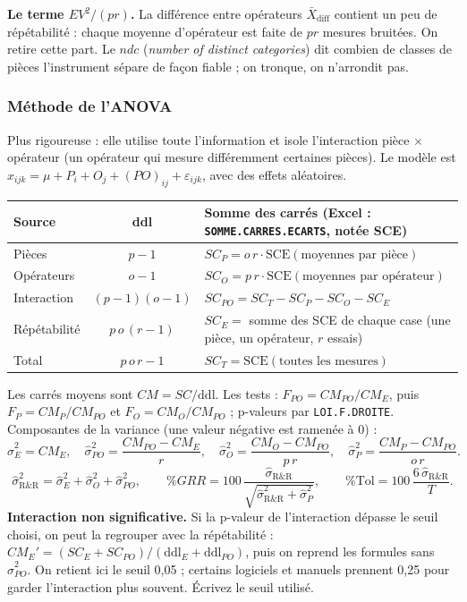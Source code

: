 \documentclass[11pt,a4paper]{article}
\newcommand{\xl}[1]{\texttt{\small #1}}
\begin{document}
\textbf{Le terme $EV^2/(pr)$.} La différence entre opérateurs $\bar X_{\text{diff}}$ contient un peu de répétabilité : chaque moyenne d'opérateur est faite de $pr$ mesures bruitées. On retire cette part. Le $ndc$ (\emph{number of distinct categories}) dit combien de classes de pièces l'instrument sépare de façon fiable ; on tronque, on n'arrondit pas.

\subsubsection{Méthode de l'ANOVA}
Plus rigoureuse : elle utilise toute l'information et isole l'interaction pièce $\times$ opérateur (un opérateur qui mesure différemment certaines pièces). Le modèle est $x_{ijk}=\mu+P_i+O_j+(PO)_{ij}+\varepsilon_{ijk}$, avec des effets aléatoires.

\begin{center}\small
\renewcommand{\arraystretch}{1.55}
\begin{tabularx}{\textwidth}{@{}lcX@{}}\toprule
\textbf{Source} & \textbf{ddl} & \textbf{Somme des carrés (Excel : \xl{SOMME.CARRES.ECARTS}, notée SCE)}\\\midrule
Pièces & $p-1$ & $SC_P=o\,r\cdot\mathrm{SCE}(\text{moyennes par pièce})$\\
Opérateurs & $o-1$ & $SC_O=p\,r\cdot\mathrm{SCE}(\text{moyennes par opérateur})$\\
Interaction & $(p-1)(o-1)$ & $SC_{PO}=SC_T-SC_P-SC_O-SC_E$\\
Répétabilité & $p\,o\,(r-1)$ & $SC_E=$ somme des SCE de chaque case (une pièce, un opérateur, $r$ essais)\\
Total & $p\,o\,r-1$ & $SC_T=\mathrm{SCE}(\text{toutes les mesures})$\\\bottomrule
\end{tabularx}
\end{center}
Les carrés moyens sont $CM=SC/\text{ddl}$. Les tests : $F_{PO}=CM_{PO}/CM_E$, puis $F_P=CM_P/CM_{PO}$ et $F_O=CM_O/CM_{PO}$ ; p-valeurs par \xl{LOI.F.DROITE}. Composantes de la variance (une valeur négative est ramenée à 0) :
\[
\hat\sigma^2_E=CM_E,\quad \hat\sigma^2_{PO}=\frac{CM_{PO}-CM_E}{r},\quad \hat\sigma^2_O=\frac{CM_O-CM_{PO}}{p\,r},\quad \hat\sigma^2_P=\frac{CM_P-CM_{PO}}{o\,r}.
\]
\[
\hat\sigma^2_{\text{R\&R}}=\hat\sigma^2_E+\hat\sigma^2_O+\hat\sigma^2_{PO},\qquad \%GRR=100\,\frac{\hat\sigma_{\text{R\&R}}}{\sqrt{\hat\sigma^2_{\text{R\&R}}+\hat\sigma^2_P}},\qquad \%\text{Tol}=100\,\frac{6\,\hat\sigma_{\text{R\&R}}}{T}.
\]
\textbf{Interaction non significative.} Si la p-valeur de l'interaction dépasse le seuil choisi, on peut la regrouper avec la répétabilité : $CM_E'=(SC_E+SC_{PO})/(\text{ddl}_E+\text{ddl}_{PO})$, puis on reprend les formules sans $\hat\sigma^2_{PO}$. On retient ici le seuil 0,05 ; certains logiciels et manuels prennent 0,25 pour garder l'interaction plus souvent. Écrivez le seuil utilisé.
\end{document}
